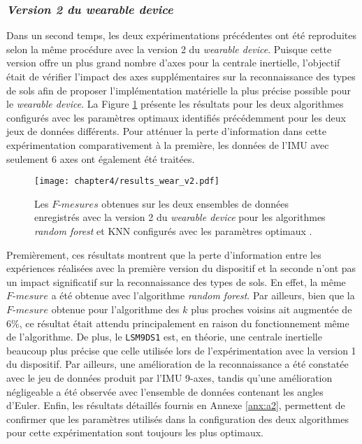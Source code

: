 \subsubsection{\textit{Version 2 du wearable device}}

Dans un second temps, les deux expérimentations précédentes ont été reproduites selon la même procédure avec la version 2 du \textit{wearable device}. Puisque cette version offre un plus grand nombre d'axes pour la centrale inertielle, l'objectif était de vérifier l'impact des axes supplémentaires sur la reconnaissance des types de sols afin de proposer l'implémentation matérielle la plus précise possible pour le \textit{wearable device}. La Figure \ref{fig:results_wear_v2} présente les résultats pour les deux algorithmes configurés avec les paramètres optimaux identifiés précédemment pour les deux jeux de données différents. Pour atténuer la perte d'information dans cette expérimentation comparativement à la première, les données de l'\acs{IMU} avec seulement 6 axes ont également été traitées.

\begin{figure}[H]
	\centering
	\texttt{[image: chapter4/results\_wear\_v2.pdf]}
        \caption[Les $F\mbox{-} mesures$ obtenues sur les deux ensembles de données enregistrés avec la version 2 du \textit{wearable device} pour les algorithmes \textit{random forest} et \acs{KNN} configurés avec les paramètres optimaux.]{Les $F\mbox{-} mesures$ obtenues sur les deux ensembles de données enregistrés avec la version 2 du \textit{wearable device} pour les algorithmes \textit{random forest} et \acs{KNN} configurés avec les paramètres optimaux \citep{Thullier2017}.}
	\label{fig:results_wear_v2}
\end{figure}

Premièrement, ces résultats montrent que la perte d'information entre les expériences réalisées avec la première version du dispositif et la seconde n'ont pas un impact significatif sur la reconnaissance des types de sols. En effet, la même $F\mbox{-}mesure$ a été obtenue avec l'algorithme \textit{random forest}. Par ailleurs, bien que la $F\mbox{-}mesure$ obtenue pour l'algorithme des $k$ plus proches voisins ait augmentée de 6\%, ce résultat était attendu principalement en raison du fonctionnement même de l'algorithme. De plus, le \texttt{LSM9DS1} est, en théorie, une centrale inertielle beaucoup plus précise que celle utilisée lors de l'expérimentation avec la version 1 du dispositif. Par ailleurs, une amélioration de la reconnaissance a été constatée avec le jeu de données produit par l'\acs{IMU} 9-axes, tandis qu'une amélioration négligeable a été observée avec l'ensemble de données contenant les angles d'Euler. Enfin, les résultats détaillés fournis en Annexe \ref{anx:a2}, permettent de confirmer que les paramètres utilisés dans la configuration des deux algorithmes pour cette expérimentation sont toujours les plus optimaux.

